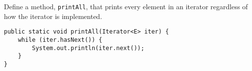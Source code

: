 \question Define a method, \texttt{printAll}, that prints every element in an iterator regardless of how the iterator is implemented.

\begin{solution}[1in]
\begin{lstlisting}
public static void printAll(Iterator<E> iter) {
    while (iter.hasNext()) {
        System.out.println(iter.next());
    }
}
\end{lstlisting}
\end{solution}
